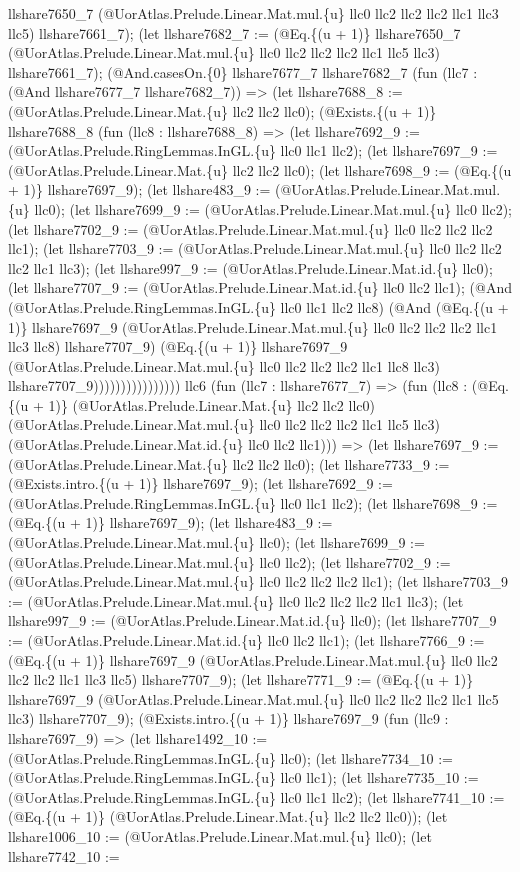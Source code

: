 \documentclass[11pt]{article}
\begin{document}
llshare7650\_7 (@UorAtlas.Prelude.Linear.Mat.mul.\{u\} llc0 llc2 llc2 llc2 llc1 llc3 llc5) llshare7661\_7); (let llshare7682\_7 := (@Eq.\{(u + 1)\} llshare7650\_7 (@UorAtlas.Prelude.Linear.Mat.mul.\{u\} llc0 llc2 llc2 llc2 llc1 llc5 llc3) llshare7661\_7); (@And.casesOn.\{0\} llshare7677\_7 llshare7682\_7 (fun (llc7 : (@And llshare7677\_7 llshare7682\_7)) => (let llshare7688\_8 := (@UorAtlas.Prelude.Linear.Mat.\{u\} llc2 llc2 llc0); (@Exists.\{(u + 1)\} llshare7688\_8 (fun (llc8 : llshare7688\_8) => (let llshare7692\_9 := (@UorAtlas.Prelude.RingLemmas.InGL.\{u\} llc0 llc1 llc2); (let llshare7697\_9 := (@UorAtlas.Prelude.Linear.Mat.\{u\} llc2 llc2 llc0); (let llshare7698\_9 := (@Eq.\{(u + 1)\} llshare7697\_9); (let llshare483\_9 := (@UorAtlas.Prelude.Linear.Mat.mul.\{u\} llc0); (let llshare7699\_9 := (@UorAtlas.Prelude.Linear.Mat.mul.\{u\} llc0 llc2); (let llshare7702\_9 := (@UorAtlas.Prelude.Linear.Mat.mul.\{u\} llc0 llc2 llc2 llc2 llc1); (let llshare7703\_9 := (@UorAtlas.Prelude.Linear.Mat.mul.\{u\} llc0 llc2 llc2 llc2 llc1 llc3); (let llshare997\_9 := (@UorAtlas.Prelude.Linear.Mat.id.\{u\} llc0); (let llshare7707\_9 := (@UorAtlas.Prelude.Linear.Mat.id.\{u\} llc0 llc2 llc1); (@And (@UorAtlas.Prelude.RingLemmas.InGL.\{u\} llc0 llc1 llc2 llc8) (@And (@Eq.\{(u + 1)\} llshare7697\_9 (@UorAtlas.Prelude.Linear.Mat.mul.\{u\} llc0 llc2 llc2 llc2 llc1 llc3 llc8) llshare7707\_9) (@Eq.\{(u + 1)\} llshare7697\_9 (@UorAtlas.Prelude.Linear.Mat.mul.\{u\} llc0 llc2 llc2 llc2 llc1 llc8 llc3) llshare7707\_9)))))))))))))))) llc6 (fun (llc7 : llshare7677\_7) => (fun (llc8 : (@Eq.\{(u + 1)\} (@UorAtlas.Prelude.Linear.Mat.\{u\} llc2 llc2 llc0) (@UorAtlas.Prelude.Linear.Mat.mul.\{u\} llc0 llc2 llc2 llc2 llc1 llc5 llc3) (@UorAtlas.Prelude.Linear.Mat.id.\{u\} llc0 llc2 llc1))) => (let llshare7697\_9 := (@UorAtlas.Prelude.Linear.Mat.\{u\} llc2 llc2 llc0); (let llshare7733\_9 := (@Exists.intro.\{(u + 1)\} llshare7697\_9); (let llshare7692\_9 := (@UorAtlas.Prelude.RingLemmas.InGL.\{u\} llc0 llc1 llc2); (let llshare7698\_9 := (@Eq.\{(u + 1)\} llshare7697\_9); (let llshare483\_9 := (@UorAtlas.Prelude.Linear.Mat.mul.\{u\} llc0); (let llshare7699\_9 := (@UorAtlas.Prelude.Linear.Mat.mul.\{u\} llc0 llc2); (let llshare7702\_9 := (@UorAtlas.Prelude.Linear.Mat.mul.\{u\} llc0 llc2 llc2 llc2 llc1); (let llshare7703\_9 := (@UorAtlas.Prelude.Linear.Mat.mul.\{u\} llc0 llc2 llc2 llc2 llc1 llc3); (let llshare997\_9 := (@UorAtlas.Prelude.Linear.Mat.id.\{u\} llc0); (let llshare7707\_9 := (@UorAtlas.Prelude.Linear.Mat.id.\{u\} llc0 llc2 llc1); (let llshare7766\_9 := (@Eq.\{(u + 1)\} llshare7697\_9 (@UorAtlas.Prelude.Linear.Mat.mul.\{u\} llc0 llc2 llc2 llc2 llc1 llc3 llc5) llshare7707\_9); (let llshare7771\_9 := (@Eq.\{(u + 1)\} llshare7697\_9 (@UorAtlas.Prelude.Linear.Mat.mul.\{u\} llc0 llc2 llc2 llc2 llc1 llc5 llc3) llshare7707\_9); (@Exists.intro.\{(u + 1)\} llshare7697\_9 (fun (llc9 : llshare7697\_9) => (let llshare1492\_10 := (@UorAtlas.Prelude.RingLemmas.InGL.\{u\} llc0); (let llshare7734\_10 := (@UorAtlas.Prelude.RingLemmas.InGL.\{u\} llc0 llc1); (let llshare7735\_10 := (@UorAtlas.Prelude.RingLemmas.InGL.\{u\} llc0 llc1 llc2); (let llshare7741\_10 := (@Eq.\{(u + 1)\} (@UorAtlas.Prelude.Linear.Mat.\{u\} llc2 llc2 llc0)); (let llshare1006\_10 := (@UorAtlas.Prelude.Linear.Mat.mul.\{u\} llc0); (let llshare7742\_10 := 
\end{document}
